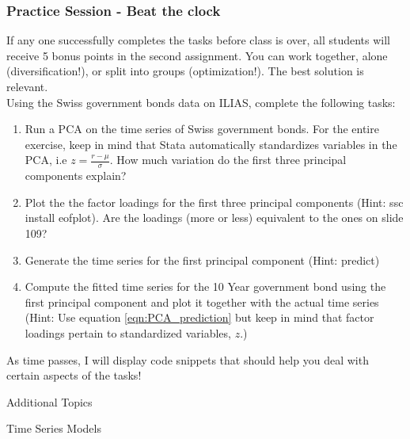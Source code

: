 \documentclass[xcolor=dvipsnames, english, 8pt]{beamer}
\begin{document}
\begin{frame}[label={end_curriculum}]
    \frametitle{Practice Session - Beat the clock}
    If any one successfully completes the tasks before class is over, all students will receive 5 bonus points in the second assignment. You can work together, alone (diversification!), or split into groups (optimization!). The best solution is relevant.\vspace{1cm}\\
    
Using the Swiss government bonds data on ILIAS, complete the following tasks:
\begin{enumerate}[1)]
	\item Run a PCA on the time series of Swiss government bonds. For the entire exercise, keep in mind that Stata automatically standardizes variables in the PCA, i.e $z = \frac{r-\mu}{\sigma}$. How much variation do the first three principal components explain?
	\item Plot the the factor loadings for the first three principal components (Hint: ssc install eofplot). Are the loadings (more or less) equivalent to the ones on slide 109?
	\item Generate the time series for the first principal component (Hint: predict)
	\item Compute the fitted time series for the 10 Year government bond using the first principal component and plot it together with the actual time series (Hint: Use equation \eqref{eqn:PCA_prediction} but keep in mind that factor loadings pertain to standardized variables, $z$.)
\end{enumerate}


\vfill

As time passes, I will display code snippets that should help you deal with certain aspects of the tasks!

\end{frame}


\begin{frame}
    \begin{center}
        {\color{ubRed} \Huge{Additional Topics}}
    \end{center}
\end{frame}


\begin{frame}[label=TS]
    \begin{center}
        {\color{ubRed} \Huge{Time Series Models}}
    \end{center}
\end{frame}
\end{document}
